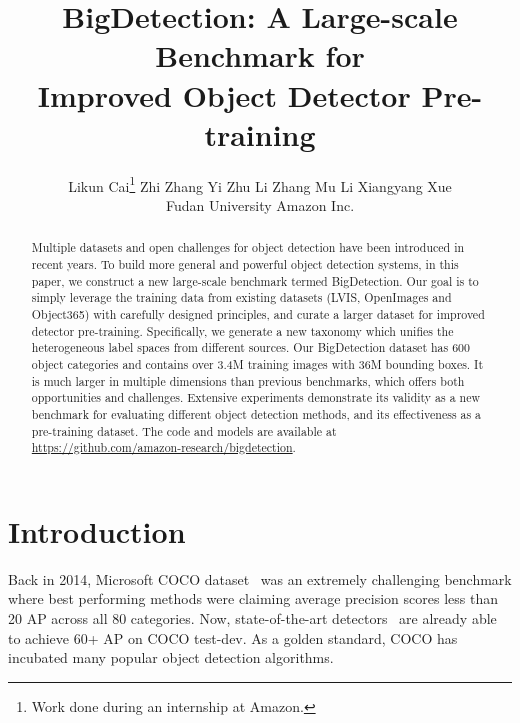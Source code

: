 \documentclass[10pt,twocolumn,letterpaper]{article}
\begin{document}
\title{BigDetection: A Large-scale Benchmark for\\
Improved Object Detector Pre-training}


\author{
Likun Cai\thanks{Work done during an internship at Amazon.} \quad Zhi Zhang \quad Yi Zhu \quad Li Zhang \quad Mu Li \quad Xiangyang Xue \\
Fudan University \qquad Amazon Inc. \qquad\\
}

\maketitle


\begin{abstract}
Multiple datasets and open challenges for object detection have been introduced in recent years. 
To build more general and powerful object detection systems, in this paper, we construct a new large-scale benchmark termed BigDetection. 
Our goal is to simply leverage the training data from existing datasets (LVIS, OpenImages and Object365) with carefully designed principles, and curate a larger dataset for improved detector pre-training.
Specifically, we generate a new taxonomy which unifies the heterogeneous label spaces from different sources. 
Our BigDetection dataset has 600 object categories and contains over 3.4M training images with 36M bounding boxes. 
It is much larger in multiple dimensions than previous benchmarks, which offers both opportunities and challenges.
Extensive experiments demonstrate its validity as a new benchmark for evaluating different object detection methods, and its effectiveness as a pre-training dataset.
The code and models are available at \url{https://github.com/amazon-research/bigdetection}.

\end{abstract} 

\section{Introduction}
\label{sec:intro}

Back in 2014, Microsoft COCO dataset~\cite{lin2014microsoft} was an extremely challenging benchmark where best performing methods were claiming average precision scores less than 20 AP across all 80 categories.
Now, state-of-the-art detectors~\cite{xu2021end,dai2021dynamic} are already able to achieve 60+ AP on COCO test-dev.
As a golden standard, COCO has incubated many popular object detection algorithms.
\end{document}
